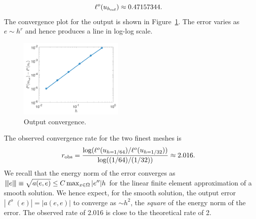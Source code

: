 \documentclass[preprint,11pt]{article}
\begin{document}
\begin{enumerate}
\begin{equation*}
    \ell^o(u_{h_{\rm ref}}) \approx 0.47157344.
  \end{equation*}
  The convergence plot for the output is shown in Figure~\ref{fig:conv}.  The error varies as $e \sim h^r$ and hence produces a line in log-log scale.
  \begin{figure}[!h]
    \centering
    \includegraphics[width=0.45\textwidth]{conv}
    \caption{Output convergence. \label{fig:conv}}
  \end{figure}
  The observed convergence rate for the two finest meshes is
  \begin{equation*}
    r_{\rm obs} = \frac{\log(\ell^o(u_{h = 1/64}) / \ell^o(u_{h = 1/32}))}{ \log( (1/64) / (1/32))} \approx 2.016.
  \end{equation*}
  We recall that the energy norm of the error converges as $|\kern-1pt|\kern-1pt| e |\kern-1pt|\kern-1pt| \equiv \sqrt{a(e,e)} \leq C \max_{x \in \Omega} | e'' | h$ for the linear finite element approximation of a smooth solution.  We hence expect, for the smooth solution, the output error $|\ell^o(e)| = |a(e,e)|$ to converge as $\sim h^2$, the \emph{square} of the energy norm of the error.  The observed rate of 2.016 is close to the theoretical rate of 2.
\end{enumerate}
\end{document}
